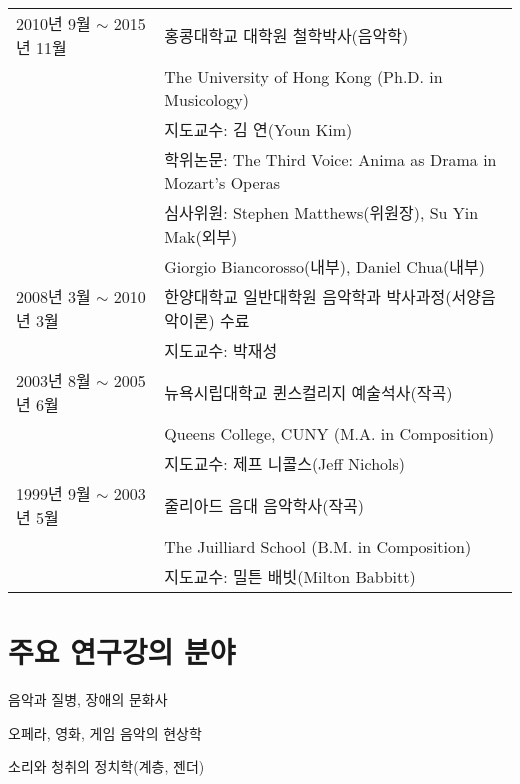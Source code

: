\documentclass[dvipdfmx,a4paper]{article}
\begin{document}
  \hspace*{-0.25cm}
  \begin{tabular}{p{4.0cm} p{10.0cm}}
    2010년 9월 $\sim$ 2015년 11월 & 홍콩대학교 대학원 철학박사(음악학)\\
    & The University of Hong Kong (Ph.D. in Musicology)\\
    & 지도교수: 김 연(Youn Kim)\\
    & 학위논문: The Third Voice: Anima as Drama in Mozart’s Operas\\
    & 심사위원: Stephen Matthews(위원장), Su Yin Mak(외부)\\
    & \hspace*{14mm} Giorgio Biancorosso(내부), Daniel Chua(내부)\\[2mm]
    
    2008년 3월 $\sim$ 2010년 3월 & 한양대학교 일반대학원 음악학과 박사과정(서양음악이론) 수료\\
    & 지도교수: 박재성\\[2mm]
    
	2003년 8월 $\sim$ 2005년 6월 & 뉴욕시립대학교 퀸스컬리지 예술석사(작곡)\\
    & Queens College, CUNY (M.A. in Composition)\\
	& 지도교수: 제프 니콜스(Jeff Nichols)\\[2mm]

    1999년 9월 $\sim$ 2003년 5월 & 줄리아드 음대 음악학사(작곡)\\
    & The Juilliard School (B.M. in Composition)\\
    & 지도교수: 밀튼 배빗(Milton Babbitt)
  \end{tabular}
  
  \vspace{5mm}
  
  \section*{\normalsize 주요 연구\textperiodcentered 강의 분야}
  
  \hspace{2mm} \textbullet \hspace{2mm} 음악과 질병, 장애의 문화사
  
  \noindent \hspace{2mm} \textbullet \hspace{2mm} 오페라, 영화, 게임 음악의 현상학
  
  \noindent \hspace{2mm} \textbullet \hspace{2mm} 소리와 청취의 정치학(계층, 젠더)
  
\end{document}
